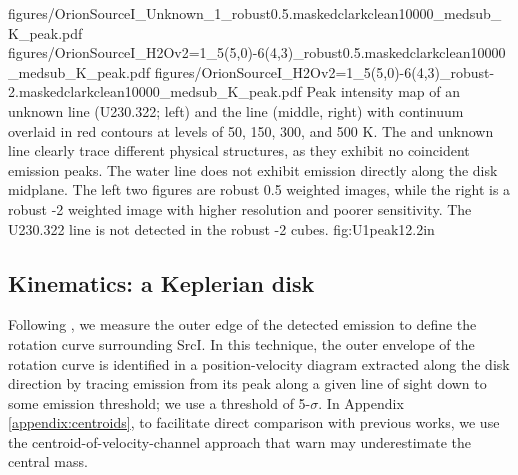 \documentclass[twocolumn]{aastex61}
\newcommand{\sourcei}{SrcI\xspace}
\begin{document}






\FigureThree
{{figures/OrionSourceI_Unknown_1_robust0.5.maskedclarkclean10000_medsub_K_peak}.pdf}
{{figures/OrionSourceI_H2Ov2=1_5(5,0)-6(4,3)_robust0.5.maskedclarkclean10000_medsub_K_peak}.pdf}
{{figures/OrionSourceI_H2Ov2=1_5(5,0)-6(4,3)_robust-2.maskedclarkclean10000_medsub_K_peak}.pdf}
{Peak intensity map of an unknown line (U230.322; left) and the \water
line (middle, right) with continuum overlaid
in red contours at levels of 
50, 150, 300, and 500 K. %
The \water and unknown line clearly trace different physical structures, as
they exhibit no coincident emission peaks.  The water line does
not exhibit emission directly along the disk midplane.
The left two figures are robust 0.5 weighted images, while the right
is a robust -2 weighted image with higher resolution and poorer
sensitivity.  The U230.322 line is not detected in the robust -2 cubes.
}
{fig:U1peak}{1}{2.2in}


\subsection{Kinematics: a Keplerian disk}
\label{sec:kinematics}
Following \citet{Seifried2016a}, we measure the outer edge of the detected
\water emission to define the rotation curve surrounding \sourcei.  In this technique,
the outer envelope of the rotation curve is identified in a position-velocity
diagram extracted along the disk direction by tracing emission from
its peak along a given line of sight down to some emission threshold;
we use a threshold of 5-$\sigma$.
In Appendix \ref{appendix:centroids}, to facilitate direct comparison with
previous works, we use the centroid-of-velocity-channel approach that
\citet{Seifried2016a} warn may underestimate the central mass.
\end{document}
